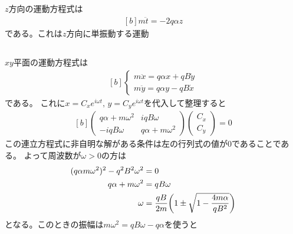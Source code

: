 \documentclass[../../master.tex]{subfiles}
\begin{document}
\subsection{}
\(z\)方向の運動方程式は
\begin{equation}\begin{aligned}[b]
    m\ddot{t} = -2q\alpha z
\end{aligned}\end{equation}
である。これは\(z\)方向に単振動する運動

\subsection{}
\(xy\)平面の運動方程式は
\begin{equation}\begin{aligned}[b]
    \begin{cases}
        m\ddot{x} = q \alpha x + qB \dot{y}\\
        m\ddot{y} = q \alpha y - qB \dot{x}
    \end{cases}
\end{aligned}\end{equation}
である。
これに\(x=C_x e^{i\omega t},\,y=C_ye^{i\omega t}\)を代入して整理すると
\begin{equation}\begin{aligned}[b]
    \begin{pmatrix}
        q\alpha + m\omega^2 & iqB\omega\\
        -iqB\omega & q\alpha + m\omega^2
    \end{pmatrix}\begin{pmatrix}
        C_x\\ C_y
    \end{pmatrix}
    =0
\end{aligned}\end{equation}
この連立方程式に非自明な解がある条件は左の行列式の値が0であることである。
よって周波数が\(\omega>0\)の方は
\begin{equation}\begin{aligned}[b]
    (q\alpha m\omega^2)^2-q^2B^2\omega^2&=0\\
    q\alpha+m\omega^2 &= qB\omega\\
    \omega &= \frac{qB}{2m}\qty(1\pm\sqrt{1-\frac{4m\alpha}{qB^2}})
\end{aligned}\end{equation}
となる。このときの振幅は\(m\omega^2 = qB\omega -q\alpha\)を使うと
\end{document}
